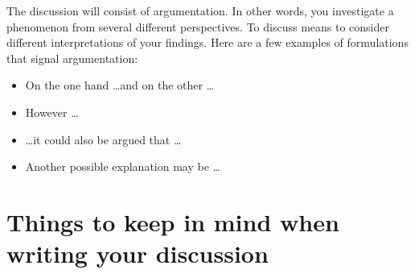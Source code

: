 \documentclass[a4paper,twoside]{bth}
\begin{document}
The discussion will consist of argumentation. In other words, you investigate a phenomenon from several different perspectives. To discuss means to consider different interpretations of your findings. Here are a few examples of formulations that signal argumentation:

\begin{itemize}
    \item On the one hand \dots and on the other \dots 
    \item However \dots
    \item \dots it could also be argued that \dots
    \item Another possible explanation may be \dots
\end{itemize}


\section{Things to keep in mind when writing your discussion}
\end{document}
